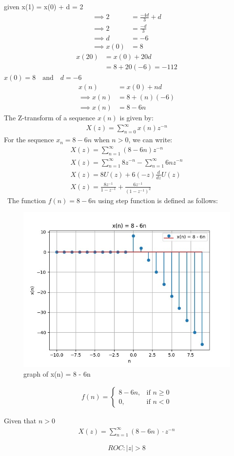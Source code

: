 \documentclass[journal,12pt,twocolumn]{IEEEtran}
\theoremstyle{remark}
\begin{document}
    given x(1) = x(0) + d = 2
    \begin{align}
        \implies 2 &= \frac{-4d}{3} +d\\
        \implies 2 &= \frac{-d}{3}\\
        \implies d &= -6\\
        \implies x(0) &= 8
    \end{align}
    \begin{align}
        x(20)&=x(0)+20d\\
        &=8+20(-6) = -112
    \end{align}
\centering
$x(0) = 8\quad \text{and}\quad d = -6$
    \begin{align}
        x(n)&=x(0)+nd\\
        \implies x(n)&=8+(n)(-6)\\
        \implies x(n)&=8-6n
    \end{align}    
The Z-transform of a sequence $x(n)$ is given by:
    \begin{align}
        X(z) = \sum_{n=0}^{\infty} x(n) z^{-n} 
    \end{align}
For the sequence $x_n = 8 - 6n$ when $n > 0$, we can write:
    \begin{align}
        X(z) = \sum_{n=1}^{\infty} (8 - 6n)z^{-n}\\
        X(z) = \sum_{n=1}^{\infty} 8z^{-n} - \sum_{n=1}^{\infty} 6nz^{-n}\\
        X(z) = 8U(z) + 6(-z)\frac{d}{dz} U(z)\\
        X(z)=\frac{8z^{-1}}{1-z^{-1}}+\frac{6z^{-1}}{(1-z^{-1})^{2}}
    \end{align}\
The function $f(n) = 8 - 6n$ using step function is defined as follows:
    \begin{figure}[h]
        \centering
        \includegraphics[width=1\linewidth]{figs/Figure_1.png}
        \caption{graph of x(n) = 8 - 6n}
        \label{8 - 6n dicrete function}
    \end{figure}
    \begin{align}
        f(n) = 
        \begin{cases}
            8 - 6n, & \text{if } n \geq 0 \\
            0, & \text{if } n < 0
        \end{cases}
    \end{align}

Given that \( n > 0 \)
    \begin{align}
    X(z) = \sum_{n=1}^{\infty} (8 - 6n) \cdot z^{-n}
    \end{align}

\[ROC : |z| > 8\]
    
\end{document}
